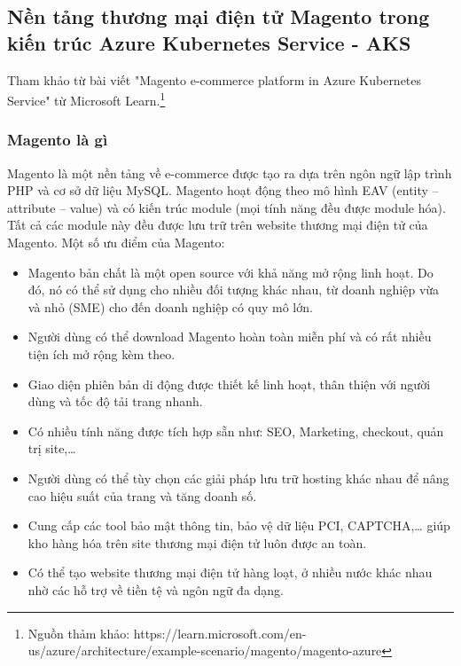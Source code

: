 \subsection{Nền tảng thương mại điện tử Magento trong kiến trúc Azure Kubernetes Service - AKS}
\noindent Tham khảo từ bài viết "Magento e-commerce platform in Azure Kubernetes Service" từ Microsoft Learn.\footnote{Nguồn thảm khảo: https://learn.microsoft.com/en-us/azure/architecture/example-scenario/magento/magento-azure}
\subsubsection{Magento là gì}
Magento là một nền tảng về e-commerce được tạo ra dựa trên ngôn ngữ lập trình PHP và cơ sở dữ liệu MySQL. Magento hoạt động theo mô hình EAV (entity – attribute – value) và có kiến trúc module (mọi tính năng đều được module hóa). Tất cả các module này đều được lưu trữ trên website thương mại điện tử của Magento.
\newline
Một số ưu điểm của Magento:
    \begin{itemize}
        \item Magento bản chất là một open source với khả năng mở rộng linh hoạt. Do đó, nó có thể sử dụng cho nhiều đối tượng khác nhau, từ doanh nghiệp vừa và nhỏ (SME) cho đến doanh nghiệp có quy mô lớn.
        \item Người dùng có thể download Magento hoàn toàn miễn phí và có rất nhiều tiện ích mở rộng kèm theo.
        \item Giao diện phiên bản di động được thiết kế linh hoạt, thân thiện với người dùng và tốc độ tải trang nhanh.
        \item Có nhiều tính năng được tích hợp sẵn như: SEO, Marketing, checkout, quản trị site,…
        \item Người dùng có thể tùy chọn các giải pháp lưu trữ hosting khác nhau để nâng cao hiệu suất của trang và tăng doanh số.
        \item Cung cấp các tool bảo mật thông tin, bảo vệ dữ liệu PCI, CAPTCHA,… giúp kho hàng hóa trên site thương mại điện tử luôn được an toàn.
        \item Có thể tạo website thương mại điện tử hàng loạt, ở nhiều nước khác nhau nhờ các hỗ trợ về tiền tệ và ngôn ngữ đa dạng.    
    \end{itemize}
